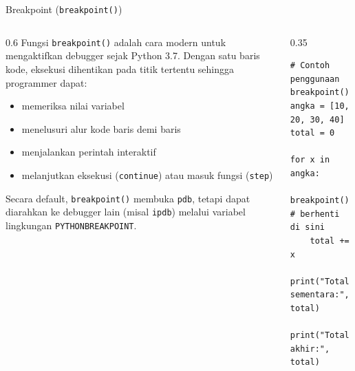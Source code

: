 \documentclass[aspectratio=169, table]{beamer}
\begin{document}
\begin{frame}[fragile]{Breakpoint (\texttt{breakpoint()})}
\vspace{10pt}

\begin{columns}[T]
\begin{column}{0.6\linewidth}
Fungsi \texttt{breakpoint()} adalah cara modern untuk
mengaktifkan debugger sejak Python 3.7. Dengan satu baris
kode, eksekusi dihentikan pada titik tertentu sehingga
programmer dapat:

\begin{itemize}
    \item memeriksa nilai variabel
    \item menelusuri alur kode baris demi baris
    \item menjalankan perintah interaktif
    \item melanjutkan eksekusi (\texttt{continue}) atau masuk fungsi (\texttt{step})
\end{itemize}

Secara default, \texttt{breakpoint()} membuka \texttt{pdb},
tetapi dapat diarahkan ke debugger lain (misal \texttt{ipdb})
melalui variabel lingkungan \texttt{PYTHONBREAKPOINT}.
\end{column}

\begin{column}{0.35\linewidth}
\begin{lstlisting}[style=PythonStyle, basicstyle=\ttfamily\scriptsize]
# Contoh penggunaan breakpoint()
angka = [10, 20, 30, 40]
total = 0

for x in angka:
    breakpoint()   # berhenti di sini
    total += x
    print("Total sementara:", total)

print("Total akhir:", total)
\end{lstlisting}
\end{column}
\end{columns}

\end{frame}
\end{document}
